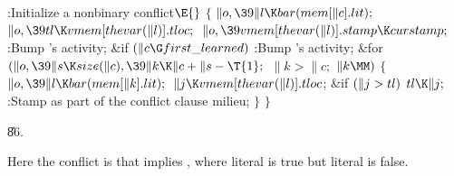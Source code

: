 \B{}:Initialize a nonbinary conflict\X${}\E{}$\6
${}\{{}$\1\6
${}\|o,\39\|l\K\\{bar}(\\{mem}[\|c].\\{lit});{}$\6
${}\|o,\39\\{tl}\K\\{vmem}[\\{thevar}(\|l)].\\{tloc};{}$\6
${}\|o,\39\\{vmem}[\\{thevar}(\|l)].\\{stamp}\K\\{curstamp};{}$\6
:Bump 's activity\X;\6
\&{if} ${}(\|c\G\\{first\_learned}){}$\1\5
:Bump 's activity\X;\2\6
\&{for} ${}(\|o,\39\|s\K\\{size}(\|c),\39\|k\K\|c+\|s-\T{1};{}$ ${}\|k>\|c;{}$
${}\|k\MM){}$\5
${}\{{}$\1\6
${}\|o,\39\|l\K\\{bar}(\\{mem}[\|k].\\{lit});{}$\6
${}\|j\K\\{vmem}[\\{thevar}(\|l)].\\{tloc}{}$;\6
\&{if} ${}(\|j>\\{tl}){}$\1\5
${}\\{tl}\K\|j;{}$\2\6
:Stamp  as part of the conflict clause milieu\X;\6
\4${}\}{}$\2\6
\4${}\}{}$\2\par
\U86.\fi

Here the conflict is that  implies ,
where literal  is
true but literal  is false.

